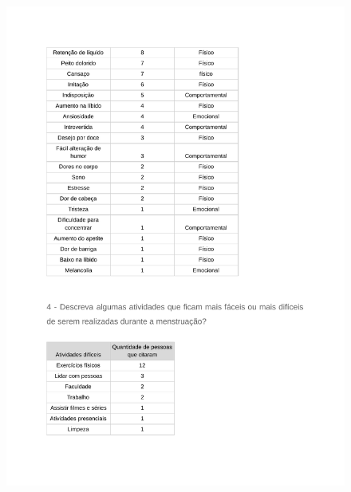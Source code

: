 \begin{apendicesenv}
        \begin{figure}[ht]
            \centering
            \includegraphics[keepaspectratio=true,scale=0.7]{figuras/Tab17.pdf}
        \end{figure}
        

\end{apendicesenv}
